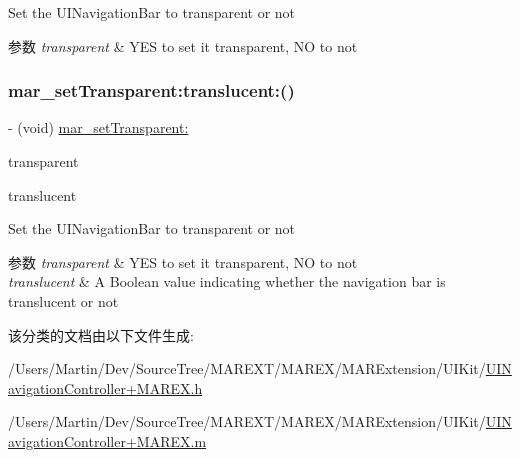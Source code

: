 Set the U\+I\+Navigation\+Bar to transparent or not


\begin{DoxyParams}{参数}
{\em transparent} & Y\+ES to set it transparent, NO to not \\
\hline
\end{DoxyParams}
\mbox{\label{category_u_i_navigation_bar_07_m_a_r_e_x___translucent_08_ae14877af0ed05f498385042a3c4b2f33}} 
\subsubsection{\texorpdfstring{mar\+\_\+set\+Transparent\+:translucent\+:()}{mar\_setTransparent:translucent:()}}
{\footnotesize\ttfamily -\/ (void) \hyperlink{category_u_i_navigation_bar_07_m_a_r_e_x___translucent_08_afe2480a72efb113ba4af0ab8ed5335bc}{mar\+\_\+set\+Transparent\+:} \begin{DoxyParamCaption}\item[{(B\+O\+OL)}]{transparent }\item[{translucent:(B\+O\+OL)}]{translucent }\end{DoxyParamCaption}}

Set the U\+I\+Navigation\+Bar to transparent or not


\begin{DoxyParams}{参数}
{\em transparent} & Y\+ES to set it transparent, NO to not \\
\hline
{\em translucent} & A Boolean value indicating whether the navigation bar is translucent or not \\
\hline
\end{DoxyParams}


该分类的文档由以下文件生成\+:\begin{DoxyCompactItemize}
\item 
/\+Users/\+Martin/\+Dev/\+Source\+Tree/\+M\+A\+R\+E\+X\+T/\+M\+A\+R\+E\+X/\+M\+A\+R\+Extension/\+U\+I\+Kit/\hyperlink{_u_i_navigation_controller_09_m_a_r_e_x_8h}{U\+I\+Navigation\+Controller+\+M\+A\+R\+E\+X.\+h}\item 
/\+Users/\+Martin/\+Dev/\+Source\+Tree/\+M\+A\+R\+E\+X\+T/\+M\+A\+R\+E\+X/\+M\+A\+R\+Extension/\+U\+I\+Kit/\hyperlink{_u_i_navigation_controller_09_m_a_r_e_x_8m}{U\+I\+Navigation\+Controller+\+M\+A\+R\+E\+X.\+m}\end{DoxyCompactItemize}
